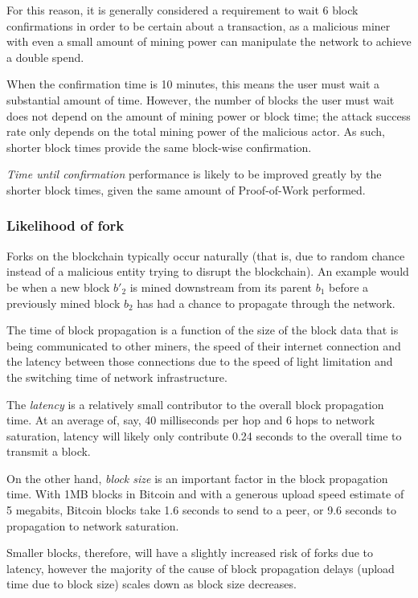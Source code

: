 \documentclass[a4paper,12pt]{article}
\begin{document}
For this reason, it is generally considered a requirement to wait 6 block confirmations in order to be certain about a transaction, as a malicious miner with even a small amount of mining power can manipulate the network to achieve a double spend.

When the confirmation time is 10 minutes, this means the user must wait a substantial amount of time. However, the number of blocks the user must wait does not depend on the amount of mining power or block time; the attack success rate only depends on the total mining power of the malicious actor. As such, shorter block times provide the same block-wise confirmation.

\textit{Time until confirmation} performance is likely to be improved greatly by the shorter block times, given the same amount of Proof-of-Work performed.

\subsubsection{Likelihood of fork}
Forks on the blockchain typically occur naturally (that is, due to random chance instead of a malicious entity trying to disrupt the blockchain). An example would be when a new block $b'_2$ is mined downstream from its parent $b_1$ before a previously mined block $b_2$ has had a chance to propagate through the network. 

The time of block propagation is a function of the size of the block data that is being communicated to other miners, the speed of their internet connection and the latency between those connections due to the speed of light limitation and the switching time of network infrastructure. 

The \textit{latency} is a relatively small contributor to the overall block propagation time. At an average of, say, 40 milliseconds per hop and 6 hops to network saturation, latency will likely only contribute 0.24 seconds to the overall time to transmit a block.

On the other hand, \textit{block size} is an important factor in the block propagation time. With 1MB blocks in Bitcoin and with a generous upload speed estimate of 5 megabits, Bitcoin blocks take 1.6 seconds to send to a peer, or 9.6 seconds to propagation to network saturation.

Smaller blocks, therefore, will have a slightly increased risk of forks due to latency, however the majority of the cause of block propagation delays (upload time due to block size) scales down as block size decreases. 
\end{document}
